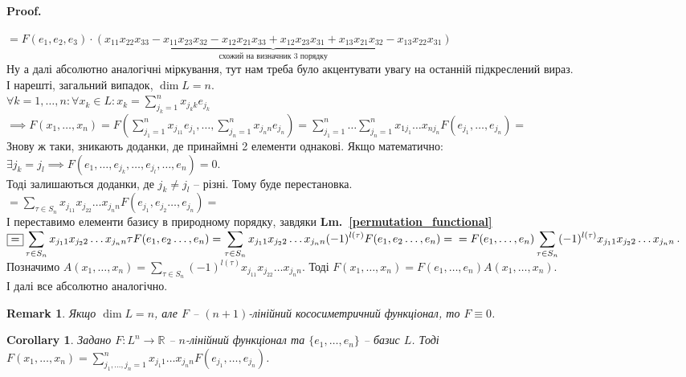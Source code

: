 \documentclass[a4paper, 10pt]{article}
\makeatletter
\theoremstyle{theoremdd}
\newtheorem{remark}[theorem]{Remark}
\newtheorem{corollary}[theorem]{Corollary}
\newcommand\lmref[1]{\textbf{Lm.~\ref{#1}}}
\renewenvironment{proof}[1][Proof.\\]{\par
\pushQED{\hfill \qed}%
\normalfont \topsep6\p@\@plus6\p@\relax
\trivlist
\item\relax
{\bfseries
#1\@addpunct{.}}\hspace\labelsep\ignorespaces
}{%
\popQED\endtrivlist\@endpefalse
}
\makeatother
\begin{document}
\begin{proof}
$\boxed{=} F(e_1,e_2,e_3)\cdot \underbrace{(x_{11}x_{22}x_{33} - x_{11}x_{23}x_{32} - x_{12}x_{21}x_{33} + x_{12}x_{23}x_{31} + x_{13}x_{21}x_{32} - x_{13}x_{22}x_{31})}_{\textrm{схожий на визначник 3 порядку}}$\\
Ну а далі абсолютно аналогічні міркування, тут нам треба було акцентувати увагу на останній підкреслений вираз.
\bigskip \\
І нарешті, загальний випадок, $\dim L = n$.\\
$\forall k = 1,\dots,n: \forall x_k \in L: x_k = \displaystyle \sum_{j_k=1}^{n} x_{j_kk}e_{j_k}$\\
$\implies F(x_1,\dots,x_n) = \displaystyle F\left(\sum_{j_1=1}^{n} x_{j_11}e_{j_1}, \dots, \sum_{j_n=1}^{n} x_{j_n n}e_{j_n}\right) = \sum_{j_1 = 1}^n \dots \sum_{j_n = 1}^n x_{1j_1}\dots x_{nj_n} F(e_{j_1},\dots,e_{j_n}) \boxed{=}$\\
Знову ж таки, зникають доданки, де принаймні 2 елементи однакові. Якщо математично:\\
$\exists j_k = j_l \implies F(e_1,\dots, e_{j_k}, \dots, e_{j_l}, \dots, e_n) = 0$.\\
Тоді залишаються доданки, де $j_k \neq j_l$ -- різні. Тому буде перестановка.\\
$\displaystyle \boxed{=} \sum_{\tau \in S_n} x_{j_11}x_{j_22}\dots x_{j_nn} F(e_{j_1},e_{j_2}\dots, e_{j_n}) \boxed{=}$\\
І переставимо елементи базису в природному порядку, завдяки \lmref{permutation_functional} \\
$\displaystyle \boxed{=} \sum_{\tau \in S_n} x_{j_11}x_{j_22}\dots x_{j_nn} \tau F(e_1,e_2\dots, e_n) = \displaystyle \sum_{\tau \in S_n} x_{j_11}x_{j_22}\dots x_{j_nn} (-1)^{l(\tau)} F(e_1,e_2\dots, e_n) = \\ = \displaystyle F(e_1,\dots,e_n) \sum_{\tau \in S_n} (-1)^{l(\tau)} x_{j_11}x_{j_22}\dots x_{j_nn}$.\\
Позначимо $A(x_1,\dots,x_n) = \displaystyle \sum_{\tau \in S_n} (-1)^{l(\tau)} x_{j_11}x_{j_22}\dots x_{j_nn}$. Тоді $F(x_1,\dots,x_n) = F(e_1,\dots,e_n)A(x_1,\dots,x_n)$.\\
І далі все абсолютно аналогічно.
\end{proof}

\begin{remark}
Якщо $\dim L = n$, але $F$ -- $(n+1)$-лінійний кососиметричний функціонал, то $F \equiv 0$.
\end{remark}

\begin{corollary}
Задано $F \colon L^n \to \mathbb{R}$ -- $n$-лінійний функціонал та $\{e_1,\dots,e_n\}$ -- базис $L$. Тоді $F(x_1,\dots,x_n) = \displaystyle\sum_{j_1,\dots,j_n=1}^n x_{j_1 1}\dots x_{j_n n} F(e_{j_1},\dots,e_{j_n})$.
\end{corollary}
\end{document}
